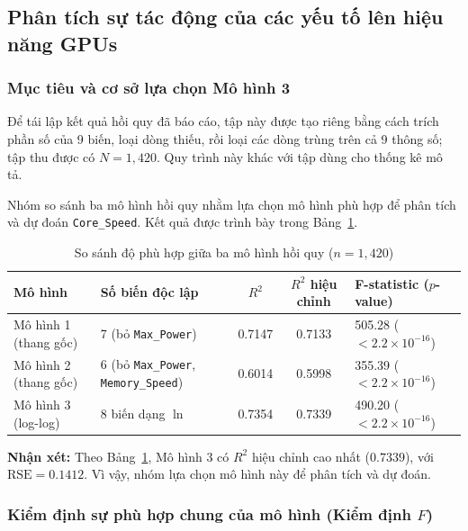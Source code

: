 \subsection{Phân tích sự tác động của các yếu tố lên hiệu năng GPUs}

\subsubsection{Mục tiêu và cơ sở lựa chọn Mô hình 3}

Để tái lập kết quả hồi quy đã báo cáo, tập này được tạo riêng bằng cách trích phần số của 9 biến, loại dòng thiếu, rồi loại các dòng trùng trên cả 9 thông số; tập thu được có $N=1{,}420$. Quy trình này khác với tập dùng cho thống kê mô tả.

Nhóm so sánh ba mô hình hồi quy nhằm lựa chọn mô hình phù hợp để phân tích và dự đoán \texttt{Core\_Speed}. Kết quả được trình bày trong Bảng~\ref{tab:so-sanh-mo-hinh}.

\begin{table}[H]
\centering
\scriptsize
\renewcommand{\arraystretch}{1.1}
\setlength{\tabcolsep}{3pt}
\caption{So sánh độ phù hợp giữa ba mô hình hồi quy ($n=1{,}420$)}
\label{tab:so-sanh-mo-hinh}
\begin{tabularx}{\textwidth}{@{}p{2.5cm} X c c p{2.7cm}@{}}
\toprule
\textbf{Mô hình} & \textbf{Số biến độc lập} & \textbf{$R^2$} & \textbf{$R^2$ hiệu chỉnh} & \textbf{F-statistic ($p$-value)} \\
\midrule
Mô hình 1 (thang gốc) & 7 (bỏ \texttt{Max\_Power}) & 0.7147 & 0.7133 & 505.28 ($<2.2\times10^{-16}$) \\
Mô hình 2 (thang gốc) & 6 (bỏ \texttt{Max\_Power}, \texttt{Memory\_Speed}) & 0.6014 & 0.5998 & 355.39 ($<2.2\times10^{-16}$) \\
Mô hình 3 (log-log) & 8 biến dạng $\ln$ & 0.7354 & 0.7339 & 490.20 ($<2.2\times10^{-16}$) \\
\bottomrule
\end{tabularx}
\end{table}

\textbf{Nhận xét:} Theo Bảng~\ref{tab:so-sanh-mo-hinh}, Mô hình 3 có $R^2$ hiệu chỉnh cao nhất ($0.7339$), với $\text{RSE}=0.1412$. Vì vậy, nhóm lựa chọn mô hình này để phân tích và dự đoán.

\subsubsection{Kiểm định sự phù hợp chung của mô hình (Kiểm định \texorpdfstring{$F$}{F})}

